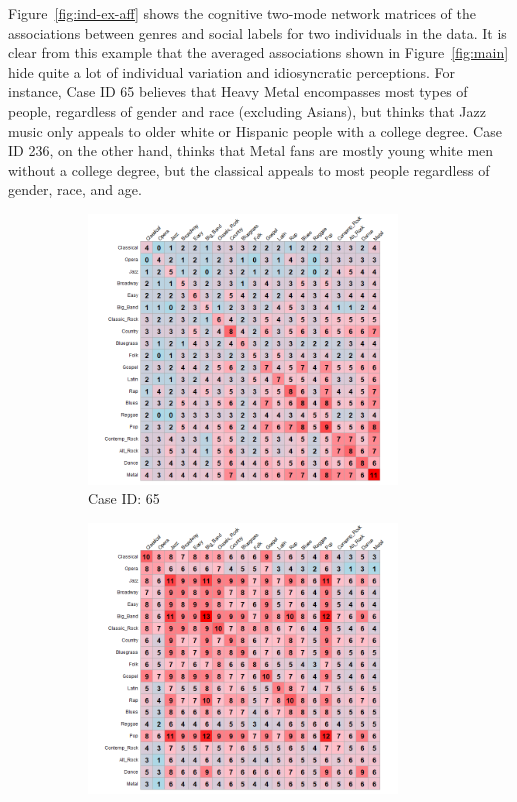 \documentclass[12pt]{article}
\begin{document}
Figure~\ref{fig:ind-ex-aff} shows the cognitive two-mode network matrices of the associations between genres and social labels for two individuals in the data. It is clear from this example that the averaged associations shown in Figure~\ref{fig:main} hide quite a lot of individual variation and idiosyncratic perceptions. For instance, Case ID 65 believes that Heavy Metal encompasses most types of people, regardless of gender and race (excluding Asians), but thinks that Jazz music only appeals to older white or Hispanic people with a college degree. Case ID 236, on the other hand, thinks that Metal fans are mostly young white men without a college degree, but the classical appeals to most people regardless of gender, race, and age.  

\begin{figure}[ht!]
    \captionsetup[subfigure]{font=footnotesize,labelfont=footnotesize}
    \centering
     \begin{subfigure}[b]{0.49\textwidth}
        \includegraphics[trim={1cm 0cm 0cm 0cm},clip, width=0.9\textwidth]{Plots/data-ex-rp1.png}
            \caption{Case ID: 65}
            \label{fig:ind-ex-rp1}
    \end{subfigure}
     \begin{subfigure}[b]{0.49\textwidth}
        \includegraphics[trim={1cm 0cm 0cm 0cm},clip, width=0.9\textwidth]{Plots/data-ex-rp2.png}

\end{subfigure}
\end{figure}
\end{document}
